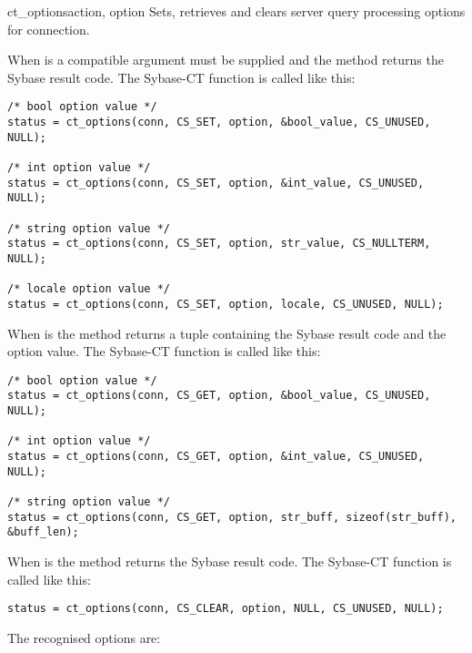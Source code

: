 \begin{methoddesc}[CS_CONNECTION]{ct_options}{action, option }
Sets, retrieves and clears server query processing options for
connection.

When  is  a compatible  argument
must be supplied and the method returns the Sybase result code.  The
Sybase-CT  function is called like this:

\begin{verbatim}
/* bool option value */
status = ct_options(conn, CS_SET, option, &bool_value, CS_UNUSED, NULL);

/* int option value */
status = ct_options(conn, CS_SET, option, &int_value, CS_UNUSED, NULL);

/* string option value */
status = ct_options(conn, CS_SET, option, str_value, CS_NULLTERM, NULL);

/* locale option value */
status = ct_options(conn, CS_SET, option, locale, CS_UNUSED, NULL);
\end{verbatim}

When  is  the method returns a tuple
containing the Sybase result code and the option value.  The
Sybase-CT  function is called like this:

\begin{verbatim}
/* bool option value */
status = ct_options(conn, CS_GET, option, &bool_value, CS_UNUSED, NULL);

/* int option value */
status = ct_options(conn, CS_GET, option, &int_value, CS_UNUSED, NULL);

/* string option value */
status = ct_options(conn, CS_GET, option, str_buff, sizeof(str_buff), &buff_len);
\end{verbatim}

When  is  the method returns the Sybase
result code.  The Sybase-CT  function is called
like this:

\begin{verbatim}
status = ct_options(conn, CS_CLEAR, option, NULL, CS_UNUSED, NULL);
\end{verbatim}

The recognised options are:


\end{methoddesc}

